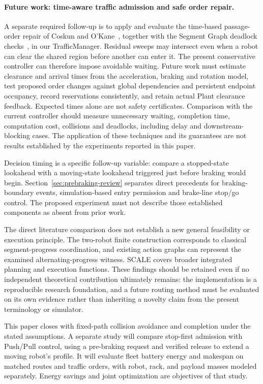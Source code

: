 \documentclass[11pt,a4paper]{article}
\theoremstyle{remark}
\begin{document}
\paragraph{Future work: time-aware traffic admission and safe order repair.}
A separate required follow-up is to apply and evaluate the time-based
passage-order repair of Coskun and O'Kane~\cite{coskun2019}, together with
the Segment Graph deadlock checks~\cite{coskun2021}, in our TrafficManager.
Residual sweeps may intersect even when a robot can clear the shared region
before another can enter it. The present conservative controller can therefore
impose avoidable waiting. Future work must estimate clearance and arrival
times from the acceleration, braking and rotation model, test proposed order
changes against global dependencies and persistent endpoint occupancy,
record reservations consistently, and retain actual Plant clearance feedback.
Expected times alone are not safety certificates. Comparison with the current
controller should measure unnecessary waiting, completion time, computation
cost, collisions and deadlocks, including delay and downstream-blocking cases.
The application of these techniques and its guarantees are not results
established by the experiments reported in this paper.

Decision timing is a specific follow-up variable: compare a stopped-state
lookahead with a moving-state lookahead triggered just before braking would
begin. Section~\ref{sec:prebraking-review} separates direct precedents for
braking-boundary events, simulation-based entry permission and brake-line
stop/go control. The proposed experiment must not describe those established
components as absent from prior work.

The direct literature comparison does not establish a new general feasibility
or execution principle. The two-robot finite construction corresponds to
classical segment-progress coordination, and existing action graphs can
represent the examined alternating-progress witness. SCALE covers broader
integrated planning and execution functions. These findings should be retained
even if no independent theoretical contribution ultimately remains: the
implementation is a reproducible research foundation, and a future routing
method must be evaluated on its own evidence rather than inheriting a novelty
claim from the present terminology or simulator.

This paper closes with fixed-path collision avoidance and completion under the
stated assumptions. A separate study will compare stop-first admission with
Push/Pull control, using a pre-braking request and verified release to extend a
moving robot's profile. It will evaluate fleet battery energy and makespan on
matched routes and traffic orders, with robot, rack, and payload masses modeled
separately. Energy savings and joint optimization are objectives of that study.
\end{document}
